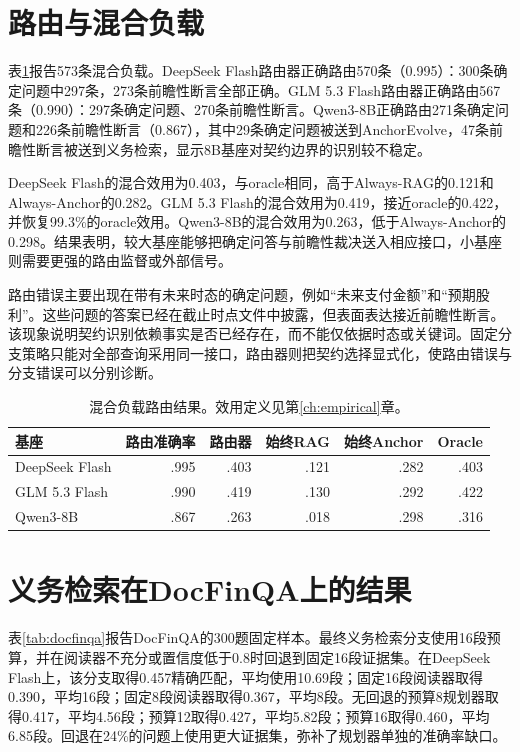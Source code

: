 \section{路由与混合负载}

表\ref{tab:router}报告573条混合负载。DeepSeek Flash路由器正确路由570条（0.995）：300条确定问题中297条，273条前瞻性断言全部正确。GLM 5.3 Flash路由器正确路由567条（0.990）：297条确定问题、270条前瞻性断言。Qwen3-8B正确路由271条确定问题和226条前瞻性断言（0.867），其中29条确定问题被送到AnchorEvolve，47条前瞻性断言被送到义务检索，显示8B基座对契约边界的识别较不稳定。

DeepSeek Flash的混合效用为0.403，与oracle相同，高于Always-RAG的0.121和Always-Anchor的0.282。GLM 5.3 Flash的混合效用为0.419，接近oracle的0.422，并恢复99.3\%的oracle效用。Qwen3-8B的混合效用为0.263，低于Always-Anchor的0.298。结果表明，较大基座能够把确定问答与前瞻性裁决送入相应接口，小基座则需要更强的路由监督或外部信号。

路由错误主要出现在带有未来时态的确定问题，例如“未来支付金额”和“预期股利”。这些问题的答案已经在截止时点文件中披露，但表面表达接近前瞻性断言。该现象说明契约识别依赖事实是否已经存在，而不能仅依据时态或关键词。固定分支策略只能对全部查询采用同一接口，路由器则把契约选择显式化，使路由错误与分支错误可以分别诊断。

\begin{table}[H]
\centering
{}
\setlength{\tabcolsep}{3pt}
\caption{混合负载路由结果。效用定义见第\ref{ch:empirical}章。}
\label{tab:router}
\begin{tabular}{lrrrrr}
\toprule
基座 & 路由准确率 & 路由器 & 始终RAG & 始终Anchor & Oracle \\
\midrule
DeepSeek Flash & .995 & .403 & .121 & .282 & .403 \\
GLM 5.3 Flash & .990 & .419 & .130 & .292 & .422 \\
Qwen3-8B & .867 & .263 & .018 & .298 & .316 \\
\bottomrule
\end{tabular}
\end{table}

\section{义务检索在DocFinQA上的结果}

表\ref{tab:docfinqa}报告DocFinQA的300题固定样本。最终义务检索分支使用16段预算，并在阅读器不充分或置信度低于0.8时回退到固定16段证据集。在DeepSeek Flash上，该分支取得0.457精确匹配，平均使用10.69段；固定16段阅读器取得0.390，平均16段；固定8段阅读器取得0.367，平均8段。无回退的预算8规划器取得0.417，平均4.56段；预算12取得0.427，平均5.82段；预算16取得0.460，平均6.85段。回退在24\%的问题上使用更大证据集，弥补了规划器单独的准确率缺口。

